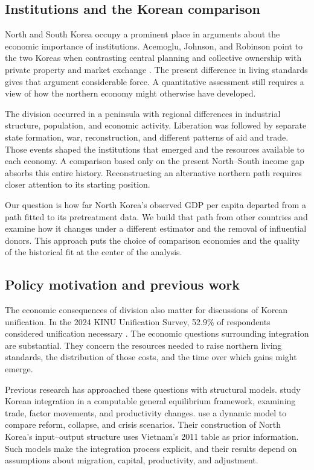 \documentclass[12pt]{article}
\begin{document}
\subsection{Institutions and the Korean comparison}
North and South Korea occupy a prominent place in arguments about the economic importance of institutions. Acemoglu, Johnson, and Robinson point to the two Koreas when contrasting central planning and collective ownership with private property and market exchange \citep[p.~1369]{acemoglu2001colonial}. The present difference in living standards gives that argument considerable force. A quantitative assessment still requires a view of how the northern economy might otherwise have developed.

The division occurred in a peninsula with regional differences in industrial structure, population, and economic activity. Liberation was followed by separate state formation, war, reconstruction, and different patterns of aid and trade. Those events shaped the institutions that emerged and the resources available to each economy. A comparison based only on the present North--South income gap absorbs this entire history. Reconstructing an alternative northern path requires closer attention to its starting position.

Our question is how far North Korea's observed GDP per capita departed from a path fitted to its pretreatment data. We build that path from other countries and examine how it changes under a different estimator and the removal of influential donors. This approach puts the choice of comparison economies and the quality of the historical fit at the center of the analysis.

\subsection{Policy motivation and previous work}
The economic consequences of division also matter for discussions of Korean unification. In the 2024 KINU Unification Survey, 52.9\% of respondents considered unification necessary \citep{kinu2024}. The economic questions surrounding integration are substantial. They concern the resources needed to raise northern living standards, the distribution of those costs, and the time over which gains might emerge.

Previous research has approached these questions with structural models. \citet{noland2000modeling} study Korean integration in a computable general equilibrium framework, examining trade, factor movements, and productivity changes. \citet{mckibbin2018modelling} use a dynamic model to compare reform, collapse, and crisis scenarios. Their construction of North Korea's input--output structure uses Vietnam's 2011 table as prior information. Such models make the integration process explicit, and their results depend on assumptions about migration, capital, productivity, and adjustment.
\end{document}
